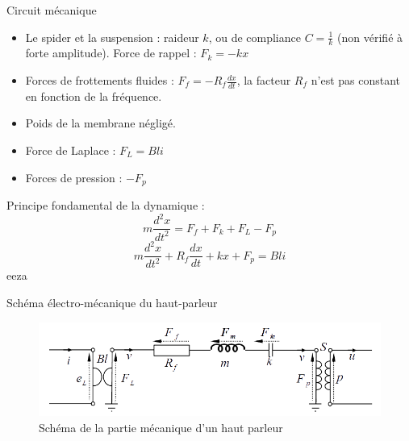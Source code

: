 \documentclass[aspectratio=169]{beamer}
\begin{document}
\begin{frame}{Circuit mécanique}
\begin{itemize}
	\item Le spider et la suspension : raideur $k$, ou de compliance $C=\frac{1}{k}$ (non vérifié à forte amplitude). Force de rappel : $F_k = -k x$
	\item Forces de frottements fluides : $F_f = -R_f \frac{dx}{dt}$, la facteur $R_f$ n'est pas constant en fonction de la fréquence.
	\item Poids de la membrane négligé.
	\item Force de Laplace : $F_L = Bli$
	\item Forces de pression : $-F_p$
\end{itemize}
	Principe fondamental de la dynamique :
	\begin{equation*}
		m \frac{d^2 x}{dt^2} = F_f + F_k + F_L - F_p
	\end{equation*}
	\begin{equation*}
		m \frac{d^2 x}{dt^2} + R_f \frac{dx}{dt} + k x + F_p = Bli 
	\end{equation*}
	eeza
\end{frame}
\begin{frame}{Schéma électro-mécanique du haut-parleur}
	\begin{figure}[!h]
	\begin{center}
	\includegraphics[width=1\textwidth]{figure/schema_meca.png}
	\end{center}
	\caption{Schéma de la partie mécanique d'un haut parleur}
	\label{schema_meca}
	\end{figure}	
\end{frame}
\end{document}
